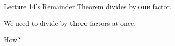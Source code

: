 \documentclass[10pt]{beamer}
\theoremstyle{definition}
\newcommand{\x}[1]{\alert{\textbf{#1}}}
\begin{document}
%
\begin{frame}{}

\vfill

\begin{center}
{\Large Lecture 14's Remainder Theorem divides by \x{one} factor.}

\vspace{1cm}

{\Large We need to divide by \x{three} factors at once.}

\vspace{1cm}

{\Large How?}
\end{center}

\vfill

\end{frame}
\end{document}
